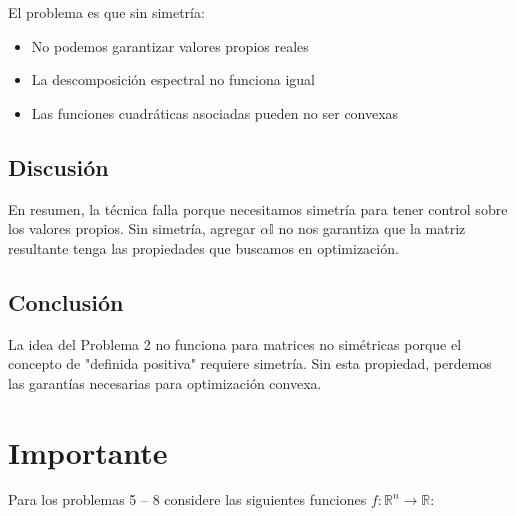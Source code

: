 \documentclass{article}
\begin{document}
El problema es que sin simetría:
\begin{itemize}
    \item No podemos garantizar valores propios reales
    \item La descomposición espectral no funciona igual
    \item Las funciones cuadráticas asociadas pueden no ser convexas
\end{itemize}

\subsection{Discusión}

En resumen, la técnica falla porque necesitamos simetría para tener control sobre los valores propios. Sin simetría, agregar $\alpha \mathbb{I}$ no nos garantiza que la matriz resultante tenga las propiedades que buscamos en optimización.

\subsection{Conclusión}

La idea del Problema 2 no funciona para matrices no simétricas porque el concepto de "definida positiva" requiere simetría. Sin esta propiedad, perdemos las garantías necesarias para optimización convexa.

\section*{Importante}
\setcounter{equation}{0}
Para los problemas 5 -- 8 considere las siguientes funciones $f : \mathbb{R}^n \rightarrow \mathbb{R}$:
\end{document}
